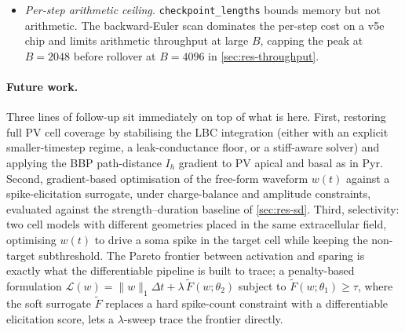 \begin{itemize}
  landscapes (a single-parameter trace-MSE perturbation and the
  position gradient at fixed waveform). Spike-count and
  spike-elicitation objectives are step-discontinuous at threshold, so
  gradient-based waveform optimisation against them requires a
  smoothed surrogate loss. Deistler et al.~\cite{deistler2025jaxley}
  apply soft-DTW to biophysical-parameter trace fits, which softens
  timing mismatches in MSE-on-trace losses; the spike-elicitation
  analogue is a differentiable spike-count surrogate, which we have
  not yet implemented. Layering either on top of the
  hierarchical-scan checkpointing and warm restarts this pipeline
  already uses is follow-up work.
  \item \emph{Per-step arithmetic ceiling.} \texttt{checkpoint\_lengths}
  bounds memory but not arithmetic. The backward-Euler scan dominates
  the per-step cost on a v5e chip and limits arithmetic throughput at
  large $B$, capping the peak at $B = 2048$ before rollover at
  $B = 4096$ in \cref{sec:res-throughput}.
\end{itemize}

\paragraph{Future work.}
Three lines of follow-up sit immediately on top of what is here. First,
restoring full PV cell coverage by stabilising the LBC integration
(either with an explicit smaller-timestep regime, a leak-conductance
floor, or a stiff-aware solver) and applying the BBP path-distance
$I_h$ gradient to PV apical and basal as in Pyr. Second, gradient-based
optimisation of the free-form waveform $w(t)$ against a
spike-elicitation surrogate, under charge-balance and amplitude
constraints, evaluated against the strength--duration baseline of
\cref{sec:res-sd}. Third, selectivity: two cell models with different
geometries placed in the same extracellular field, optimising $w(t)$
to drive a soma spike in the target cell while keeping the non-target
subthreshold. The Pareto frontier between activation and sparing is
exactly what the differentiable pipeline is built to trace; a
penalty-based formulation
$\mathcal{L}(w) = \lVert w \rVert_1 \Delta t
+ \lambda\,\tilde{F}(w;\theta_2)$ subject to
$\tilde{F}(w;\theta_1) \ge \tau$, where the soft surrogate $\tilde{F}$
replaces a hard spike-count constraint with a differentiable
elicitation score, lets a $\lambda$-sweep trace the frontier directly.

